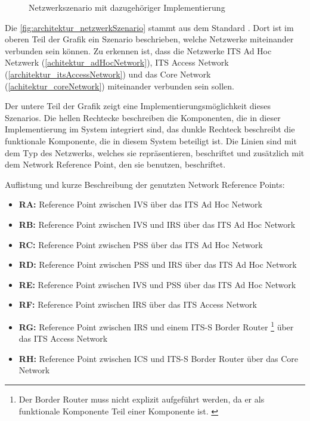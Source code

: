 \begin{figure}
	\caption{Netzwerkszenario mit dazugehöriger Implementierung \cite{etsi302636-3}}
	\label{fig:architektur_netzwerkSzenario}
\end{figure}

Die \autoref{fig:architektur_netzwerkSzenario} stammt aus dem Standard \cite{etsi302636-3}. Dort ist im oberen Teil der Grafik ein Szenario beschrieben, welche Netzwerke miteinander verbunden sein können.  Zu erkennen ist, dass die Netzwerke ITS Ad Hoc Netzwerk (\autoref{achitektur_adHocNetwork}), ITS Access Network  (\autoref{architektur_itsAccessNetwork}) und das Core Network (\autoref{achitektur_coreNetwork}) miteinander verbunden sein sollen.

Der untere Teil der Grafik zeigt eine Implementierungsmöglichkeit dieses Szenarios. Die hellen Rechtecke beschreiben die Komponenten, die in dieser Implementierung im System integriert sind, das dunkle Rechteck beschreibt die funktionale Komponente, die in diesem System beteiligt ist. Die Linien sind mit dem Typ des Netzwerks, welches sie repräsentieren, beschriftet und zusätzlich mit dem Network Reference Point, den sie benutzen, beschriftet.

Auflistung und kurze Beschreibung der genutzten Network Reference Points:
\begin{itemize}
	\item \textbf{RA: } Reference Point zwischen \ac{IVS} über das ITS Ad Hoc Network
	\item \textbf{RB: } Reference Point zwischen \ac{IVS} und \ac{IRS} über das ITS Ad Hoc Network
	\item \textbf{RC: } Reference Point zwischen \ac{PSS} über das ITS Ad Hoc Network
	\item \textbf{RD: } Reference Point zwischen \ac{PSS} und \ac{IRS} über das ITS Ad Hoc Network
	\item \textbf{RE: } Reference Point zwischen \ac{IVS} und \ac{PSS} über das ITS Ad Hoc Network
	\item \textbf{RF: } Reference Point zwischen \ac{IRS} über das ITS Access Network
	\item \textbf{RG: } Reference Point zwischen \ac{IRS} und einem ITS-S Border Router \footnote{Der Border Router muss nicht explizit aufgeführt werden, da er als funktionale Komponente Teil einer Komponente ist. \label{ftn:borderRouter}} über das ITS Access Network 
	\item \textbf{RH: } Reference Point zwischen \ac{ICS} und ITS-S Border Router  über das Core Network		
\end{itemize}

